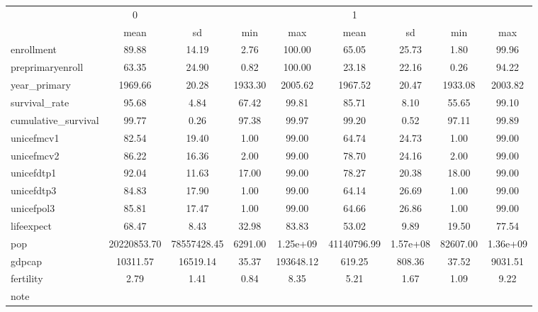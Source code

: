 \begin{tabular}{l*{2}{cccc}}
\toprule
            &           0&            &            &            &           1&            &            &            \\
            &        mean&          sd&         min&         max&        mean&          sd&         min&         max\\
\midrule
enrollment  &       89.88&       14.19&        2.76&      100.00&       65.05&       25.73&        1.80&       99.96\\
preprimaryenroll&       63.35&       24.90&        0.82&      100.00&       23.18&       22.16&        0.26&       94.22\\
year\_primary&     1969.66&       20.28&     1933.30&     2005.62&     1967.52&       20.47&     1933.08&     2003.82\\
survival\_rate&       95.68&        4.84&       67.42&       99.81&       85.71&        8.10&       55.65&       99.10\\
cumulative\_survival&       99.77&        0.26&       97.38&       99.97&       99.20&        0.52&       97.11&       99.89\\
unicefmcv1  &       82.54&       19.40&        1.00&       99.00&       64.74&       24.73&        1.00&       99.00\\
unicefmcv2  &       86.22&       16.36&        2.00&       99.00&       78.70&       24.16&        2.00&       99.00\\
unicefdtp1  &       92.04&       11.63&       17.00&       99.00&       78.27&       20.38&       18.00&       99.00\\
unicefdtp3  &       84.83&       17.90&        1.00&       99.00&       64.14&       26.69&        1.00&       99.00\\
unicefpol3  &       85.81&       17.47&        1.00&       99.00&       64.66&       26.86&        1.00&       99.00\\
lifeexpect  &       68.47&        8.43&       32.98&       83.83&       53.02&        9.89&       19.50&       77.54\\
pop         & 20220853.70& 78557428.45&     6291.00&    1.25e+09& 41140796.99&    1.57e+08&    82607.00&    1.36e+09\\
gdpcap      &    10311.57&    16519.14&       35.37&   193648.12&      619.25&      808.36&       37.52&     9031.51\\
fertility   &        2.79&        1.41&        0.84&        8.35&        5.21&        1.67&        1.09&        9.22\\
\bottomrule
\multicolumn{9}{l}{\footnotesize note}\\
\end{tabular}
